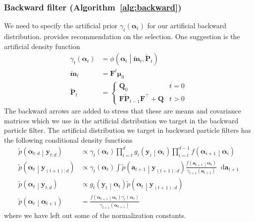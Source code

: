 \documentclass[notitlepage]{article}
\renewcommand{\vec}[1]{\bm{#1}}
\newcommand{\vecLarrow}[1]{\overleftarrow{\vec{#1}}}
\newcommand{\mat}[1]{\mathbf{#1}}
\newcommand{\matLarrow}[1]{\overleftarrow{\mat{#1}}}
\newcommand{\Lparen}[1]{\left( #1\right)}
\newcommand{\Cond}[2]{ #1 \middle\vert  #2}
\newcommand*\diff{\mathop{}\!\mathrm{d}}
\newcommand{\optor}[2]{#1\Lparen{#2}}
\newcommand{\optorC}[3]{\optor{#1}{\Cond{#2}{#3}}}
\newcommand{\pdenstC}[2]{\optorC{\widetilde p}{#1}{#2}}
\newcommand{\normaldC}[3]{\optorC{\phi}{#1}{#2,#3}}
\newcommand{\nPeriods}{d}
\begin{document}
\subsubsection*{Backward filter (Algorithm~\ref{alg:backward})}
We need to specify the artificial prior $\gamma_t\Lparen{\vec{\alpha}_t}$ for our artificial backward distribution. 
\citet[p. 69-70]{briers09} provides recommendation on the selection. One suggestion is the artificial density function %
%
\begin{equation}\begin{split}\label{eq:artfiPrior}
	\gamma_t\Lparen{\vec{\alpha}_t} &=
		\normaldC{\vec{\alpha}_t}{\vecLarrow{m}_t}{\matLarrow{P}_t} \\
%
	\vecLarrow{m}_t &= \mat{F}^t\vec\mu_0 \\
%
	\matLarrow{P}_t &= \left\{
		\begin{matrix} \mat{Q}_0 & t = 0 \\ \mat{F}\matLarrow{P}_{t - 1}\mat{F}^\top + 
		\mat{Q} & t > 0   \end{matrix} \right.
\end{split}\end{equation}%
%
The backward arrows are added to stress that these are means and covariance matrices which we use in 
the artificial distribution we target in the backward particle filter. 
The artificial distribution we target in backward particle filters has
the following conditional density functions%
%
\begin{align}
\pdenstC{\vec{\alpha}_{t:d}}{\vec{y}_{t:\nPeriods}} &\propto 
	\gamma_t \Lparen{\vec{\alpha}_t}
	\prod_{i=t}^d \optorC{g_i}{\vec y_i}{\vec\alpha_i}
	\prod_{i=t}^{d-1} \optorC{f}{\vec\alpha_{i + 1}}{\vec\alpha_i} \nonumber\\
\pdenstC{\vec{\alpha}_t}{\vec{y}_{(t + 1):\nPeriods}} & \propto
	\gamma_t(\vec\alpha_t)
	\int \pdenstC{\vec a_{t+1}}{\vec{y}_{(t+1):\nPeriods}}
	\frac{
		\optorC{f}{\vec a_{t + 1}}{\vec\alpha_t}%
	}{
		\gamma_{t+1}(\vec a_{t+1})	
	}\diff\vec a_{t+1} \nonumber\\
\pdenstC{\vec{\alpha}_t}{\vec{y}_{t:\nPeriods}} &\propto 
	\optorC{g_t}{\vec y_t}{\vec\alpha_t}
	\pdenstC{\vec{\alpha}_t}{\vec{y}_{(t + 1):\nPeriods}} \nonumber\\
\pdenstC{\vec{\alpha}_t}{\vec{\alpha}_{t +1}} &= \label{eq:bwTrans}
	\frac{
		\optorC{f}{\vec\alpha_{t+1}}{\vec\alpha_t}
		\gamma_t(\vec\alpha_t)
	}{\gamma_{t+1}(\vec\alpha_{t + 1})}
\end{align}%
%
where we have left out some of the normalization constants. 
\end{document}
